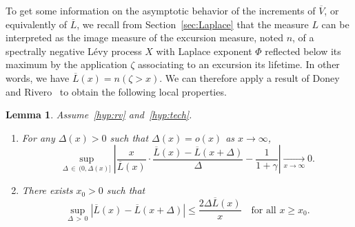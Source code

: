 \documentclass[10pt]{amsart}
\newtheorem{lemm}[theo]{Lemma}
\theoremstyle{definition}
\numberwithin{equation}{section}
\renewcommand{\bar}[1]{\overline{#1}}
\newcommand*{\relabel}{\renewcommand{\labelenumi}{(\theenumi)}}
\newcommand*{\romanenumi}{\renewcommand*{\theenumi}{\roman{enumi}}\relabel}
\begin{document}
To get some information on the asymptotic behavior of the increments of $\bar V$, or equivalently of $\bar L$, we recall from Section~\ref{sec:Laplace} that the measure $L$ can be interpreted as the image measure of the excursion measure, noted $n$, of a spectrally negative Lévy process $X$ with Laplace exponent $\Phi$ reflected below its maximum by the application $\zeta$ associating to an excursion its lifetime. In other words, we have $\bar L(x)=n(\zeta>x)$. We can therefore apply a result of Doney and Rivero~\cite{DR13,DR16_err} to obtain the following local properties.

\begin{lemm}\label{lem:increments}
Assume~\eqref{hyp:rv} and~\eqref{hyp:tech}.
\begin{enumerate}\romanenumi
\item\label{lemm3.3.1} For any $\Delta(x)>0$ such that $\Delta(x)=o(x)$ as $x \rightarrow \infty$,
\[
\sup_{\Delta\,\in\,(0,\Delta(x)]} \left|\frac{x}{\bar L(x)} \cdot \frac{\bar L(x)-\bar L(x+\Delta)}{\Delta} - \frac{1}{1+\gamma}\right| \underset{x \rightarrow \infty}\rightarrow 0.
\]
\item\label{lemm3.3.2} There exists $x_0>0$ such that
\[
\sup_{\Delta\,>\,0} \left|\bar L(x)-\bar L(x+\Delta) \right| \leq \frac{2 \Delta \bar L(x)}{x} \quad \text{for all } x \geq x_0.
\]
\end{enumerate}
\end{lemm}
\end{document}
